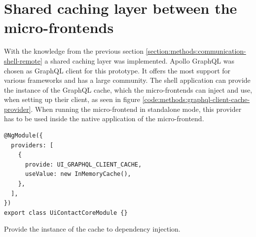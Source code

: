 \documentclass[MSE,Master,english]{twbook}%
\begin{document}
\ifshowUnusedContent


\fi

\section{Shared caching layer between the micro-frontends}

With the knowledge from the previous section \ref{section:methods:communication-shell-remote} a shared caching layer was implemented. Apollo GraphQL was chosen as GraphQL client for this prototype. It offers the most support for various frameworks and has a large community. The shell application can provide the instance of the GraphQL cache, which the micro-frontends can inject and use, when setting up their client, as seen in figure \ref{code:methods:graphql-client-cache-provider}. When running the micro-frontend in standalone mode, this provider has to be used inside the native application of the micro-frontend.

\ifshowUnusedContent
\fi

\ifshowListings
\begin{listing}[H]
\begin{verbatim}
@NgModule({
  providers: [
    {
      provide: UI_GRAPHQL_CLIENT_CACHE,
      useValue: new InMemoryCache(),
    },
  ],
})
export class UiContactCoreModule {}
\end{verbatim}
\caption{Provide the instance of the cache to dependency injection.}\label{code:methods:graphql-client-cache-provider}
\end{listing}
\fi
\end{document}
